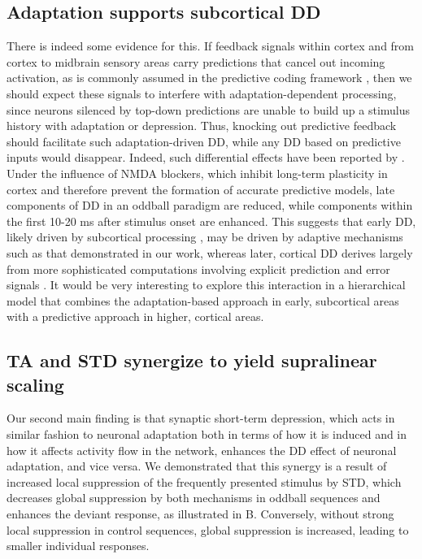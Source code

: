 \documentclass[9pt,lineno,onehalfspacing]{elife}
\begin{document}
\subsection{Adaptation supports subcortical DD}

There is indeed some evidence for this. If feedback signals within cortex and from cortex to midbrain sensory areas carry predictions that cancel out incoming activation, as is commonly assumed in the predictive coding framework \citep{Rao1999-xc, Friston2005-jz, Carbajal2018-sd}, then we should expect these signals to interfere with adaptation-dependent processing, since neurons silenced by top-down predictions are unable to build up a stimulus history with adaptation or depression. Thus, knocking out predictive feedback should facilitate such adaptation-driven DD, while any DD based on predictive inputs would disappear. Indeed, such differential effects have been reported by \cite{Harms2018-bg}. Under the influence of NMDA blockers, which inhibit long-term plasticity in cortex and therefore prevent the formation of accurate predictive models, late components of DD in an oddball paradigm are reduced, while components within the first 10-20 ms after stimulus onset are enhanced. This suggests that early DD, likely driven by subcortical processing \citep{Grimm2012-tb, Parras2017-fp, Font-Alaminos2020-fs}, may be driven by adaptive mechanisms such as that demonstrated in our work, whereas later, cortical DD derives largely from more sophisticated computations involving explicit prediction and error signals \citep{Schlossmacher2022-zv, Grimm2016-fr}. It would be very interesting to explore this interaction in a hierarchical model that combines the adaptation-based approach in early, subcortical areas with a predictive approach \citep{Wacongne2012-ah, Wacongne2016-ht, Hertag2020-kc} in higher, cortical areas. 

\subsection{TA and STD synergize to yield supralinear scaling}

Our second main finding is that synaptic short-term depression, which acts in similar fashion to neuronal adaptation both in terms of how it is induced and in how it affects activity flow in the network, enhances the DD effect of neuronal adaptation, and vice versa. We demonstrated that this synergy is a result of increased local suppression of the frequently presented stimulus by STD, which decreases global suppression by both mechanisms in oddball sequences and enhances the deviant response, as illustrated in B. Conversely, without strong local suppression in control sequences, global suppression is increased, leading to smaller individual responses.
\end{document}

